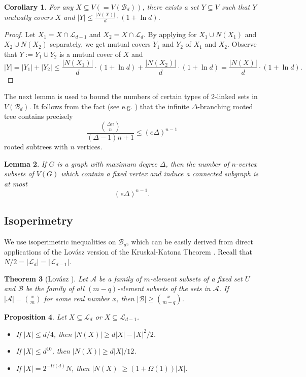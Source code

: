 \documentclass{amsart}
\newtheorem{thm}{Theorem}[section]
\newtheorem{prop}[thm]{Proposition}
\newtheorem{cor}[thm]{Corollary}
\newtheorem{lem}[thm]{Lemma}
\theoremstyle{definition}
\newcommand{\gO}{\Omega}
\newcommand{\cA}{\mathcal{A} }
\newcommand{\cB}{\mathcal{B} }
\newcommand{\cL}{\mathcal{L} }
\newcommand{\beq}[1]{\begin{equation}\label{#1}}
\newcommand{\enq}[0]{\end{equation}}
\newcommand{\0}[0]{\emptyset}
\begin{document}
\begin{cor}\label{cor:cover}
For any $X\subseteq V (=V(\cB_d))$, there exists a set $Y\subseteq V$ such that $Y$ mutually covers $X$ and $|Y|\leq \frac{|N(X)|}{d}\cdot (1 + \ln d)$.
\end{cor}
\begin{proof}
Let $X_1=X\cap\cL_{d-1}$ and $X_2=X\cap\cL_{d}$. By applying  for $X_1\cup N(X_1)$ and  $X_2\cup N(X_2)$
separately, we get mutual covers $Y_1$ and $Y_2$ of $X_1$ and $X_2$. Observe that $Y:=Y_1\cup Y_2$ is a mutual cover of $X$ and 
\[
|Y|=|Y_1|+|Y_2|\leq \frac{|N(X_1)|}{d}\cdot (1 + \ln d) + \frac{|N(X_2)|}{d}\cdot (1 + \ln d)=\frac{|N(X)|}{d}\cdot (1 + \ln d).
\]
\end{proof}




The next lemma is used to bound the numbers of certain types of 2-linked sets in $V(\cB_d)$.
It follows from the fact (see e.g. \cite[p.\ 396, Ex.11]{Knuth}) that the
infinite $\Delta$-branching rooted tree contains precisely
\[\frac{{{\Delta n} \choose n}}{(\Delta-1)n+1} \le (e\Delta)^{n-1}\]
rooted subtrees with $n$ vertices.

\begin{lem}\label{lem:numlinkset}
If $G$ is a graph with maximum degree $\Delta$, then the number of $n$-vertex
subsets of $V(G)$ which contain a fixed vertex and induce a connected subgraph is at most 
\beq{eq:numlinkset}(e\Delta)^{n-1}.\enq
\end{lem}



\subsection{Isoperimetry}

We use isoperimetric inequalities on $\cB_d$, which can be easily derived from direct applications of the Lov\'asz version of the Kruskal-Katona Theorem \cite{Katona, Kruskal}. Recall that $N/2=|\cL_d|=|\cL_{d-1}|$.

\begin{thm}[Lov\'asz \cite{Lovasz}]\label{thm.Lovasz} Let $\cA$ be a family of $m$-element subsets of a fixed set $U$ and $\cB$ be the family of all $(m-q)$-element subsets of the sets in $\cA$. If $|\cA|={x \choose m}$ for some real number $x$, then $|\cB| \ge {x \choose m-q}$.
\end{thm}

\begin{prop}\label{lem:isoper}
Let $X \subseteq \mathcal{L}_d$ or $X\subseteq \mathcal{L}_{d-1}$.
\begin{itemize}
\item[\rm (i)] If $|X|\leq d/4$, then $|N(X)|\geq d|X| - |X|^2/2$.

\item[\rm (ii)] If $|X|\leq d^{10}$, then $|N(X)|\geq d|X|/12$.

\item[\rm (iii)] If $|X|=2^{-\gO(d)}N$, then $|N(X)| \ge (1+\gO(1))|X|$.


\end{itemize}
\end{prop}
\end{document}
